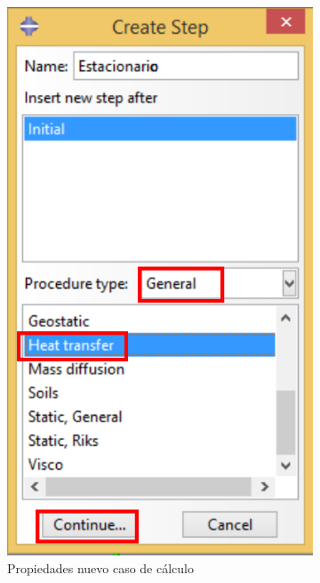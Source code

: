 \begin{figure}[!h]
\begin{subfigure}[!h]{0.39\textwidth}
      \includegraphics[width=\textwidth]{./body/images/step02.pdf}
      \caption{Propiedades nuevo caso de cálculo}
      \label{step02}
    \end{subfigure}%
    ~ %
    \begin{subfigure}[!h]{0.39\textwidth}

\end{subfigure}
\end{figure}
